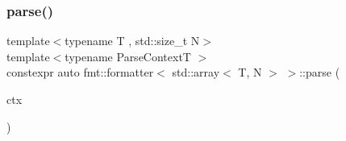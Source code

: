 \mbox{\label{structfmt_1_1formatter_3_01std_1_1array_3_01_t_00_01_n_01_4_01_4_ad7ce9e0afb4b059a6d6fbf70dfeca616}} 
\subsubsection{\texorpdfstring{parse()}{parse()}}
{\footnotesize\ttfamily template$<$typename T , std\+::size\+\_\+t N$>$ \\
template$<$typename Parse\+ContextT $>$ \\
constexpr auto fmt\+::formatter$<$ std\+::array$<$ T, N $>$ $>$\+::parse (\begin{DoxyParamCaption}\item[{Parse\+ContextT \&}]{ctx }\end{DoxyParamCaption})}

